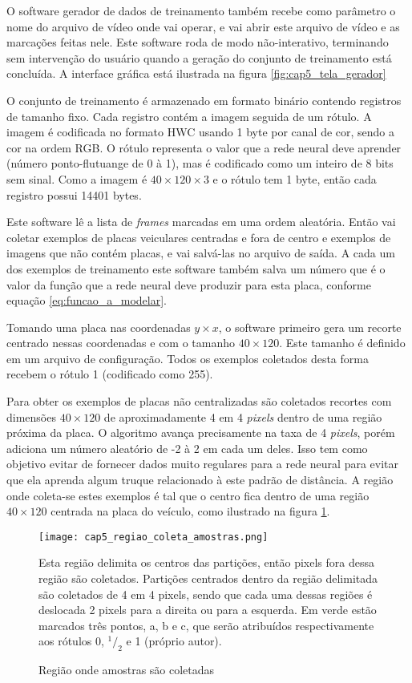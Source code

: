 O software gerador de dados de treinamento também recebe como parâmetro o nome
do arquivo de vídeo onde vai operar, e vai abrir este arquivo de vídeo e as
marcações feitas nele. Este software roda de modo não-interativo,
terminando sem intervenção do usuário quando a geração do conjunto de
treinamento está concluída. A interface gráfica está ilustrada na figura
\ref{fig:cap5_tela_gerador}

O conjunto de treinamento é armazenado em formato binário contendo registros de
tamanho fixo. Cada registro contém a imagem seguida de um rótulo. A
imagem é codificada no formato HWC usando 1 byte por canal de cor,
sendo a cor na ordem RGB. O rótulo representa o valor que a rede neural
deve aprender (número ponto-flutuange de 0 à 1), mas é codificado como um
inteiro de
8 bits sem sinal.  Como a imagem é $40 \times 120 \times 3$ e o rótulo
tem 1 byte, então cada registro possui 14401 bytes.

Este software lê a lista de \emph{frames} marcadas em uma ordem
aleatória. Então vai coletar exemplos de placas veiculares centradas e fora
de centro e exemplos de imagens que não contém placas, e vai salvá-las no
arquivo de saída. A cada um dos exemplos de treinamento este software
também salva um número que é o valor da função que a rede neural deve
produzir para esta placa, conforme equação \ref{eq:funcao_a_modelar}.

Tomando uma placa nas coordenadas $y \times x$, o software primeiro gera um
recorte centrado nessas coordenadas e com o tamanho $40 \times 120$. Este
tamanho é definido em um arquivo de configuração. Todos os exemplos
coletados desta forma recebem o rótulo 1 (codificado como 255).

Para obter os exemplos de placas não centralizadas são coletados recortes
com dimensões $40 \times 120$ de
aproximadamente 4 em 4 \emph{pixels} dentro de uma região próxima da placa. O
algoritmo avança precisamente na taxa de 4 \emph{pixels}, porém adiciona um
número aleatório de -2 à 2 em cada um deles. Isso tem como objetivo evitar de
fornecer dados muito regulares para a rede neural para evitar que ela
aprenda algum truque relacionado à este padrão de distância. A região onde
coleta-se estes exemplos é tal que o centro fica dentro de uma região
$40 \times 120$ centrada na placa do veículo, como ilustrado na figura
\ref{fig:cap5_regiao_coleta_amostras}.

\begin{figure}[!htb]
	\centering
	\texttt{[image: cap5\_regiao\_coleta\_amostras.png]}
	\caption{Região onde amostras são coletadas}
	\label{fig:cap5_regiao_coleta_amostras}
	Esta região delimita os centros das partições, então pixels fora dessa
	região são coletados. Partições centrados dentro da região delimitada são
	coletados de 4 em 4 pixels, sendo que cada uma dessas regiões é deslocada 2
	pixels para a direita ou para a esquerda. Em verde estão marcados três
	pontos, a, b e c, que serão atribuídos respectivamente aos rótulos 0,
	$^1/_2$ e 1 (próprio autor).
\end{figure}

